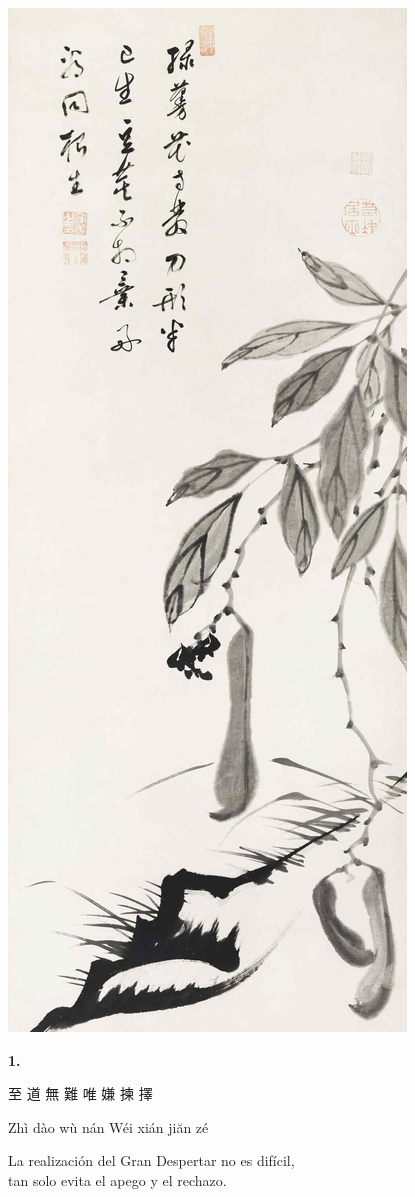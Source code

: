 \documentclass[
  a5paperpaper,
]{article}
\begin{document}
\includegraphics{../img/image01.jpg}

\begin{verseblock}

\newpage

\begin{center}\textbf{1.}\end{center}

至 道 無 難 唯 嫌 揀 擇

Zhì dào wù nán Wéi xián jiăn zé

La realización del Gran Despertar no es difícil,\\
tan solo evita el apego y el rechazo.

\end{verseblock}
\end{document}
